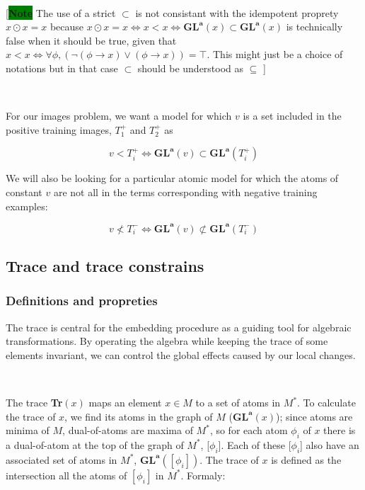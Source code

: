 \documentclass[a4paper, 11pt]{article}
\begin{document}
\

[\colorbox{green}{\textbf{Note}} The use of a strict $\subset$ is not consistant with the idempotent proprety $x \odot x = x$ because $x \odot x = x \Leftrightarrow x < x \Leftrightarrow \boldsymbol{GL}^{\boldsymbol{a}}(x) \subset \boldsymbol{GL}^{\boldsymbol{a}}(x)$ is technically false when it should be true, given that $x < x \Leftrightarrow \forall \phi, (\neg(\phi \rightarrow x) \lor (\phi \rightarrow x)) = \top$. This might just be a choice of notations but in that case $\subset$ should be understood as $\subseteq$ ]

\

For our images problem, we want a model for which $v$ is a set included in the positive training images, $T_1^+$ and $T_2^+$ as 

\begin{equation*}
    v < T_i^+ \Leftrightarrow \boldsymbol{GL}^{\boldsymbol{a}}(v) \subset \boldsymbol{GL}^{\boldsymbol{a}}(T_i^+)
\end{equation*}

We will also be looking for a particular atomic model for which the atoms of constant $v$ are not all in the terms corresponding with negative training examples:

\begin{equation*}
    v \not< T_i^- \Leftrightarrow \boldsymbol{GL}^{\boldsymbol{a}}(v) \not\subset \boldsymbol{GL}^{\boldsymbol{a}}(T_i^-)
\end{equation*}

\subsection{Trace and trace constrains}

\subsubsection{Definitions and propreties}

The trace is central for the embedding procedure as a guiding tool for algebraic transformations.
By operating the algebra while keeping the trace of some elements invariant, we can control the global effects caused by our local changes.

\

The trace \textbf{Tr}$(x)$ maps an element $x \in M$ to a set of atoms in $M^{\ast}$. To calculate the trace of $x$, we find its atoms in the graph of $M$ ($\boldsymbol{GL}^{\boldsymbol{a}}(x)$); since atoms are minima of $M$, dual-of-atoms are maxima of $M^{\ast}$, so for each atom $\phi_i$ of $x$ there is a dual-of-atom at the top of the graph of $M^{\ast}$, [$\phi_i$]. Each of these [$\phi_i$] also have an associated set of atoms in $M^{\ast}$, $\boldsymbol{GL}^{\boldsymbol{a}}([\phi_i])$. The trace of $x$ is defined as the intersection all the atoms of $[\phi_i]$ in $M^{\ast}$. Formaly:
\end{document}
